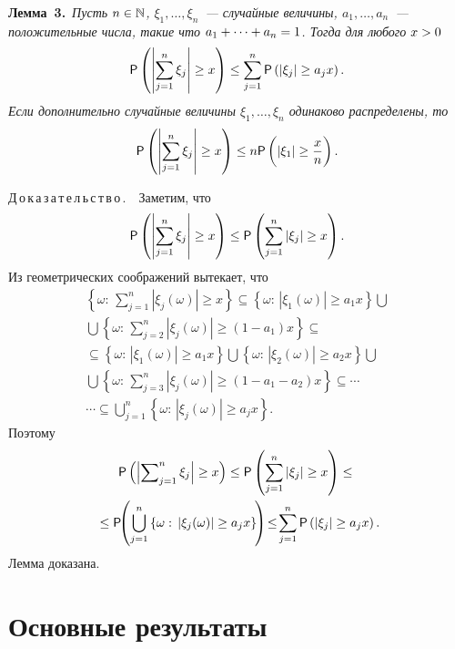 \begin{multicols}{2}
\smallskip

\noindent
\textbf{Лемма~3.}\ \textit{Пусть $n\hm\in\mathbb{N}$, $\xi_1,\ldots,\xi_n$~--- случайные величины, 
$a_1,\ldots,a_n$~--- положительные числа, такие что
$a_1+\cdots+a_n\hm=1$. Тогда для любого $x\hm>0$
$$
{\sf P}\left(\left|\sum\limits_{j=1}^n\xi_j\right|\ge x\right)\le\sum\limits_{j=1}^n{\sf P}\left(|\xi_j|\ge a_jx\right).
$$
Если дополнительно случайные величины $\xi_1,\ldots,\xi_n$ одинаково распределены, то}
$$
{\sf P}\left(\left|\sum\limits_{j=1}^n\xi_j\right|\ge x\right)\le n{\sf P}\left(\left\vert \xi_1\right\vert \ge 
\displaystyle\frac{\displaystyle x\mathstrut}{\displaystyle n\mathstrut}\right).
$$


\smallskip

\noindent
Д\,о\,к\,а\,з\,а\,т\,е\,л\,ь\,с\,т\,в\,о\,.\ \ Заметим, что
$$
{\sf P}\left(\left|\sum\limits_{j=1}^n\xi_j\right|\ge x\right)\le{\sf P}\left(\sum\limits_{j=1}^n|\xi_j|
\ge x\right).
$$
Из геометрических соображений вытекает, что
\begin{multline*}
\left\{\omega:\, \sum\limits_{j=1}^n|\xi_j(\omega)|\ge x\right\}\subseteq
\left\{\omega:\,\left\vert \xi_1(\omega)\right\vert \ge a_1x\right\}\bigcup{}\\
{}\bigcup
\left\{\omega:\, \sum\limits_{j=2}^n \left\vert \xi_j(\omega)\right\vert \ge 
\left(1-a_1\right)x\right\}\subseteq
{}\\
{}
\subseteq\left\{\omega:\,\left\vert \xi_1(\omega)\right\vert \ge a_1x\right\}\bigcup
\left\{\omega:\,\left\vert \xi_2(\omega)\right\vert \ge a_2x\right\}\bigcup{}\\
{}\bigcup
\left\{\omega:\, \sum\limits_{j=3}^n\left\vert \xi_j(\omega)\right\vert
\ge \left(1-a_1-a_2\right)x\right\}\subseteq\cdots
\\
\cdots\subseteq\bigcup\limits_{j=1}^n\left\{\omega:\,\left\vert \xi_j(\omega)\right\vert
\ge a_jx\right\}.
\end{multline*}
Поэтому
\begin{multline*}
{\sf P}\left(\left\vert \sum\nolimits_{j=1}^n\xi_j\right\vert \ge x\right)
\le{\sf P}\left(\sum\limits_{j=1}^n\left\vert \xi_j\right\vert \ge x\right)\le
{}\\
{}
\le{\sf P}\!\!\left(\bigcup\limits_{j=1}^n\left\{\omega:\,\left\vert \xi_j(\omega)\right\vert
\ge a_jx\right\}\!\right)\!
\le\!\sum\limits_{j=1}^n{\sf P}\left(\left\vert \xi_j\right\vert \ge a_jx\right).\hspace*{-0.93279pt}
\end{multline*}
Лемма доказана.


\section{Основные результаты}



\end{multicols}
